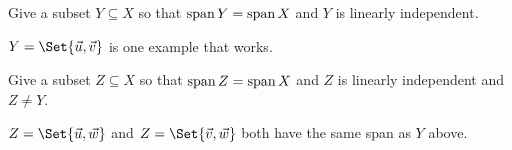 \documentclass{problemset}
\newcommand{\bookonlynewpage}{\begin{bookonly}\newpage\end{bookonly}}
\begin{document}
	\begin{parts}[resume]
		\item Give a subset $Y\subseteq X$ so that $\operatorname{span} Y=\operatorname{span} X$ and $Y$ is
			linearly independent.
			\begin{solution}
				$Y = \Set{\vec u,\vec v}$ is one example that works.
			\end{solution}
		\item Give a subset $Z\subseteq X$ so that $\operatorname{span} Z=\operatorname{span} X$ and $Z$ is
			linearly independent and $Z\neq Y$.
			\begin{solution}
				$Z = \Set{\vec u, \vec w}$ and $Z = \Set{\vec v, \vec w}$ both have
				the same span as $Y$ above.
			\end{solution}
	\end{parts}


	\bookonlynewpage
\end{document}
